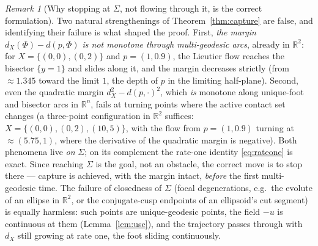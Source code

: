 \documentclass[11pt]{article}
\theoremstyle{remark}
\newtheorem{remark}[theorem]{Remark}
\newcommand{\R}{\mathbb{R}}
\newcommand{\X}{X}
\newcommand{\dX}{d_{\X}}
\begin{document}
\begin{remark}[Why stopping at $\Sigma$, not flowing through it, is the
correct formulation]\label{rem:notmonotone}
Two natural strengthenings of Theorem~\ref{thm:capture} are false, and
identifying their failure is what shaped the proof. First, \emph{the
margin $\dX(\Phi)-d(p,\Phi)$ is not monotone through multi-geodesic
arcs}, already in $\R^{2}$: for $\X=\{(0,0),(0,2)\}$ and $p=(1,0.9)$,
the Lieutier flow reaches the bisector $\{y=1\}$ and slides along it,
and the margin decreases strictly (from $\approx1.345$ toward the
limit $1$, the depth of $p$ in the limiting half-plane). Second, even
the quadratic margin $\dX^{2}-d(p,\cdot)^{2}$, which \emph{is}
monotone along unique-foot and bisector arcs in $\R^{n}$, fails at
turning points where the active contact set changes (a three-point
configuration in $\R^{2}$ suffices: $\X=\{(0,0),(0,2),(10,5)\}$, with
the flow from $p=(1,0.9)$ turning at $\approx(5.75,1)$, where the
derivative of the quadratic margin is negative). Both phenomena live
\emph{on} $\Sigma$; on its complement the rate-one identity
\eqref{eq:rateone} is exact. Since reaching $\Sigma$ is the goal, not
an obstacle, the correct move is to stop there --- capture is
achieved, with the margin intact, \emph{before} the first
multi-geodesic time. The failure of closedness of $\Sigma$ (focal
degenerations, e.g.\ the evolute of an ellipse in $\R^{2}$, or the
conjugate-cusp endpoints of an ellipsoid's cut segment) is equally
harmless: such points are unique-geodesic points, the field $-u$ is
continuous at them (Lemma~\ref{lem:usc}), and the trajectory passes
through with $\dX$ still growing at rate one, the foot sliding
continuously.
\end{remark}
\end{document}
